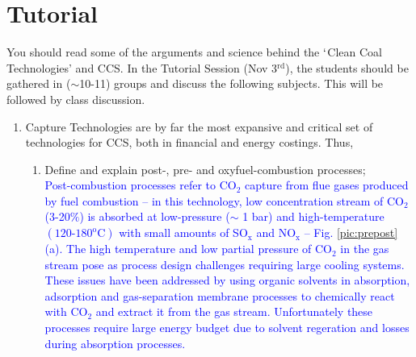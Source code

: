 \documentclass[14pt,twoside]{article}
\begin{document}
\section{Tutorial}
You should read some of the arguments and science behind the $\lq$Clean Coal Technologies' and CCS. In the Tutorial Session (Nov 3$^{\text{rd}}$), the students should be gathered in ($\sim$10-11) groups and discuss the following subjects. This will be followed by class discussion.
\begin{enumerate}
\item Capture Technologies are by far the most expansive and critical set of technologies for CCS, both in financial and energy costings. Thus,  
\begin{enumerate}
\item Define and explain post-, pre- and oxyfuel-combustion processes;\\
  \textcolor{blue}{
Post-combustion processes refer to CO$_{\text{2}}$ capture from flue gases produced by fuel combustion -- in this technology, low concentration stream of CO$_{\text{2}}$ (3-20$\%$) is absorbed at low-pressure ($\sim$ 1 bar) and high-temperature $\left(\text{120-180}^{\text{o}}\text{C}\right)$ with small amounts of SO$_{\text{x}}$ and NO$_{\text{x}}$ -- Fig. \ref{pic:prepost}(a). The high temperature and low partial pressure of CO$_{\text{2}}$ in the gas stream pose as process design challenges requiring large cooling systems. These issues have been addressed by using organic solvents in absorption, adsorption and gas-separation membrane processes to chemically react with CO$_{\text{2}}$ and extract it from the gas stream. Unfortunately these processes require large energy budget due to solvent regeration and losses during absorption processes.}


\end{enumerate}
\end{enumerate}
\end{document}
